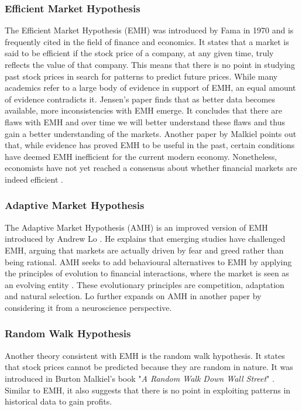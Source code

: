 \documentclass{UoYCSproject}
\begin{document}
\subsubsection{Efficient Market Hypothesis}
The Efficient Market Hypothesis (EMH) was introduced by Fama in 1970  \cite{malkiel1970efficient} and is frequently cited in the field of finance and economics. It states that a market is said to be efficient if the stock price of a company, at any given time, truly reflects the value of that company. This means that there is no point in studying past stock prices in search for patterns to predict future prices. While many academics refer to a large body of evidence in support of EMH, an equal amount of evidence contradicts it. Jensen's \cite{jensen1978some} paper finds that as better data becomes available, more inconsistencies with EMH emerge. It concludes that there are flaws with EMH and over time we will better understand these flaws and thus gain a better understanding of the markets. Another paper by Malkiel \cite{malkiel2003efficient} points out that, while evidence has proved EMH to be useful in the past, certain conditions have deemed EMH inefficient for the current modern economy. Nonetheless, economists have not yet reached a consensus about whether financial markets are indeed efficient \cite{lo2004adaptive}.  

\subsubsection{Adaptive Market Hypothesis}
The Adaptive Market Hypothesis (AMH) is an improved version of EMH introduced by Andrew Lo \cite{lo2004adaptive}. He explains that emerging studies have challenged EMH, arguing that markets are actually driven by fear and greed rather than being rational. AMH seeks to add behavioural alternatives to EMH by applying the principles of evolution to financial interactions, where the market is seen as an evolving entity \cite{lo2004adaptive}. These evolutionary principles are competition, adaptation and natural selection. Lo further expands on AMH in another paper \cite{lo2005reconciling}
by considering it from a neuroscience perspective.

\subsubsection{Random Walk Hypothesis}
Another theory consistent with EMH is the random walk hypothesis. It states that stock prices cannot be predicted because they are random in nature. It was introduced in Burton Malkiel's book "\textit{A Random Walk Down Wall Street}" \cite{malkiel1973random}. Similar to EMH, it also suggests that there is no point in exploiting patterns in historical data to gain profits.  
\end{document}
